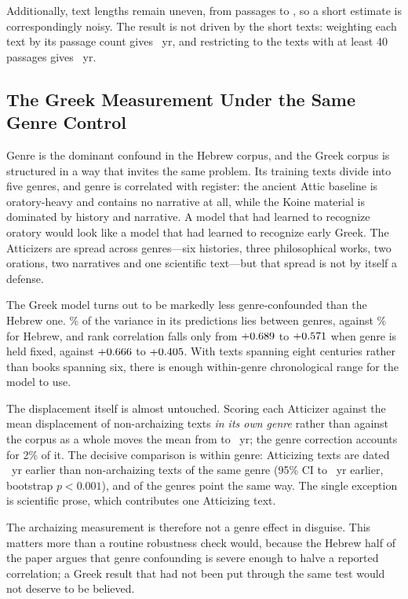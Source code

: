 \documentclass[10pt,letterpaper]{article}
\begin{document}
Additionally, text lengths remain uneven, from \GKattminpass{} passages to
\GKattmaxpass, so a short estimate is correspondingly noisy.  The result is not
driven by the short texts: weighting each text by its passage count gives
\GKattshiftW~yr, and restricting to the \GKattbign{} texts with at least 40
passages gives \GKattshiftBig~yr.

\subsection*{The Greek Measurement Under the Same Genre Control}

Genre is the dominant confound in the Hebrew corpus, and the Greek corpus is
structured in a way that invites the same problem.  Its \GKntexts{} training
texts divide into five genres, and genre is correlated with register: the
ancient Attic baseline is oratory-heavy and contains no narrative at all, while
the Koine material is dominated by history and narrative.  A model that had
learned to recognize oratory would look like a model that had learned to
recognize early Greek.  The Atticizers are spread across genres---six
histories, three philosophical works, two orations, two narratives and one
scientific text---but that spread is not by itself a defense.

The Greek model turns out to be markedly less genre-confounded than the Hebrew
one.  \GKbetween\% of the variance in its predictions lies between genres,
against \GNbetween\% for Hebrew, and rank correlation falls only from
$+0.689$ to $+0.571$ when genre is held fixed, against $+0.666$ to
$+0.405$.  With \GKntexts{} texts spanning eight centuries rather than
\HBbooks{} books spanning six, there is enough within-genre chronological range
for the model to use.

The displacement itself is almost untouched.  Scoring each Atticizer against
the mean displacement of non-archaizing texts \emph{in its own genre} rather
than against the corpus as a whole moves the mean from \GKshiftRaw{} to
\GKshiftAdj~yr; the genre correction accounts for 2\% of it.  The decisive
comparison is within genre: Atticizing texts are dated \GKwithinAbs~yr
earlier than non-archaizing texts of the same genre (95\% CI \GKwithinAbsLo{}
to \GKwithinAbsHi~yr earlier, bootstrap $p < 0.001$), and \GKwithinNeg{} of the \GKwithinN{}
genres point the same way.  The single exception is scientific prose, which
contributes one Atticizing text.

The archaizing measurement is therefore not a genre effect in disguise.  This
matters more than a routine robustness check would, because the Hebrew half of
the paper argues that genre confounding is severe enough to halve a reported
correlation; a Greek result that had not been put through the same test would
not deserve to be believed.
\end{document}
